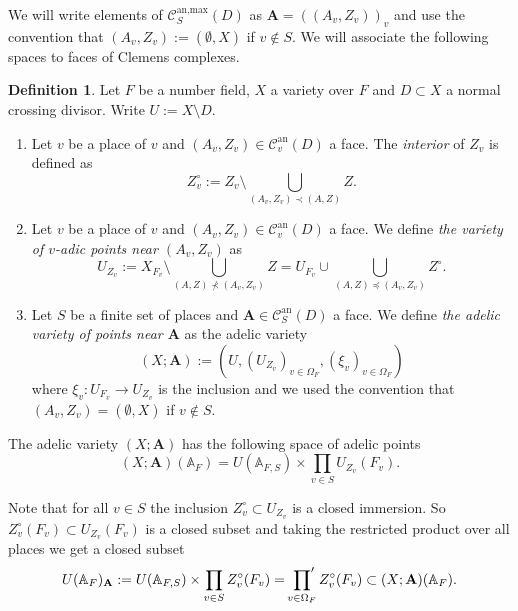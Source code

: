\documentclass[a4paper,11pt,reqno]{amsart}
\newcommand{\A}{\mathbb{A}}
\theoremstyle{definition}
\newtheorem{definition}[theorem]{Definition}
\begin{document}
We will write elements of $\mathcal{C}_{S}^{\text{an,max}}(D)$ as $\mathbf{A} = ((A_v, Z_v))_{v}$ and use the convention that $(A_v, Z_v) := (\emptyset, X)$ if $v \not \in S$.
We will associate the following spaces to faces of Clemens complexes.
\begin{definition}
	Let $F$ be a number field, $X$ a variety over $F$ and $D \subset X$ a normal crossing divisor. Write $U := X \setminus D$.
	\begin{enumerate}
		\item Let $v$ be a place of $v$ and $(A_v, Z_v) \in \mathcal{C}_v^{\text{an}}(D)$ a face. The \emph{interior} of $Z_v$ is defined as 
		\begin{equation*}
			Z_v^{\circ} := Z_v \setminus \bigcup_{(A_v, Z_v) \prec (A, Z)} Z.
		\end{equation*}
		\item Let $v$ be a place of $v$ and $(A_v, Z_v) \in \mathcal{C}_v^{\text{an}}(D)$ a face. We define \emph{the variety of $v$-adic points near $(A_v, Z_v)$} as 
		\begin{equation*}
			U_{Z_v} := X_{F_v} \setminus \bigcup_{(A, Z) \nprec (A_v, Z_v)} Z = U_{F_v} \cup \bigcup_{(A, Z) \preceq (A_v, Z_v)} Z^{\circ}.
		\end{equation*}
		\item Let $S$ be a finite set of places and $\mathbf{A} \in \mathcal{C}^{\text{an}}_{S}(D)$ a face. We define \emph{the adelic variety of points near $\mathbf{A}$} as the adelic variety
		\begin{equation*}
			(X; {\mathbf{A}}) := (U, (U_{Z_v})_{v \in \Omega_F}, (\xi_v)_{v \in \Omega_F})
		\end{equation*}
		where $\xi_v: U_{F_v} \to U_{Z_v}$ is the inclusion and we used the convention that $(A_v, Z_v) = (\emptyset, X)$ if $v \not \in S$.
	\end{enumerate} 
\end{definition}

The adelic variety $(X ; {\mathbf{A}})$ has the following space of adelic points
\begin{equation*}
	(X; {\mathbf{A}})(\A_F) = U(\A_{F, S}) \times \prod_{v \in S} U_{Z_v}(F_v). 
\end{equation*}

Note that for all $v \in S$ the inclusion $Z_v^{\circ} \subset U_{Z_v}$ is a closed immersion. So $Z_v^{\circ}(F_v) \subset U_{Z_v}(F_v)$ is a closed subset and taking the restricted product over all places we get a closed subset
\begin{equation*}
	U(\A_F)_{\mathbf{A}} := U(\A_{F, S}) \times \prod_{v \in S} Z_v^{\circ}(F_v) = \sideset{}{'}\prod_{v \in \Omega_{F}} Z_v^{\circ}(F_v) \subset (X; {\mathbf{A}})(\A_F).
\end{equation*}
\end{document}

